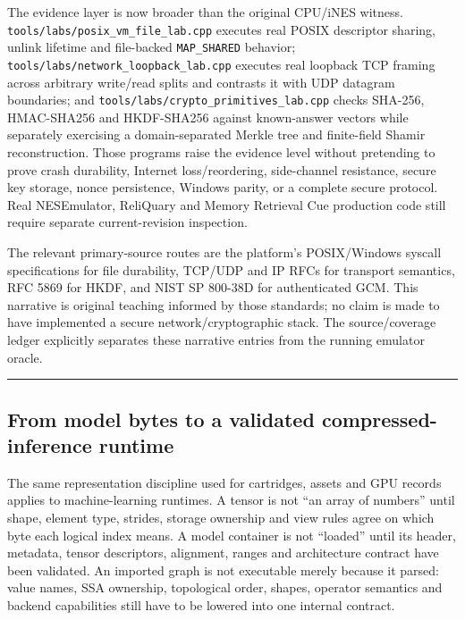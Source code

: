 The evidence layer is now broader than the original CPU/iNES witness. \texttt{tools/labs/posix\_vm\_file\_lab.cpp} executes real POSIX descriptor sharing, unlink lifetime and file-backed \texttt{MAP\_SHARED} behavior; \texttt{tools/labs/network\_loopback\_lab.cpp} executes real loopback TCP framing across arbitrary write/read splits and contrasts it with UDP datagram boundaries; and \texttt{tools/labs/crypto\_primitives\_lab.cpp} checks SHA-256, HMAC-SHA256 and HKDF-SHA256 against known-answer vectors while separately exercising a domain-separated Merkle tree and finite-field Shamir reconstruction. Those programs raise the evidence level without pretending to prove crash durability, Internet loss/reordering, side-channel resistance, secure key storage, nonce persistence, Windows parity, or a complete secure protocol. Real NESEmulator, ReliQuary and Memory Retrieval Cue production code still require separate current-revision inspection.

The relevant primary-source routes are the platform's POSIX/Windows syscall specifications for file durability, TCP/UDP and IP RFCs for transport semantics, RFC 5869 for HKDF, and NIST SP 800-38D for authenticated GCM. This narrative is original teaching informed by those standards; no claim is made to have implemented a secure network/cryptographic stack. The source/coverage ledger explicitly separates these narrative entries from the running emulator oracle.

\begin{center}\rule{0.5\linewidth}{0.5pt}\end{center}

\subsection{From model bytes to a validated compressed-inference runtime}\label{01-foundations-i-ch017-from-model-bytes-to-a-validated-compressed-inference-runtime}

The same representation discipline used for cartridges, assets and GPU records applies to machine-learning runtimes. A tensor is not ``an array of numbers'' until shape, element type, strides, storage ownership and view rules agree on which byte each logical index means. A model container is not ``loaded'' until its header, metadata, tensor descriptors, alignment, ranges and architecture contract have been validated. An imported graph is not executable merely because it parsed: value names, SSA ownership, topological order, shapes, operator semantics and backend capabilities still have to be lowered into one internal contract.

